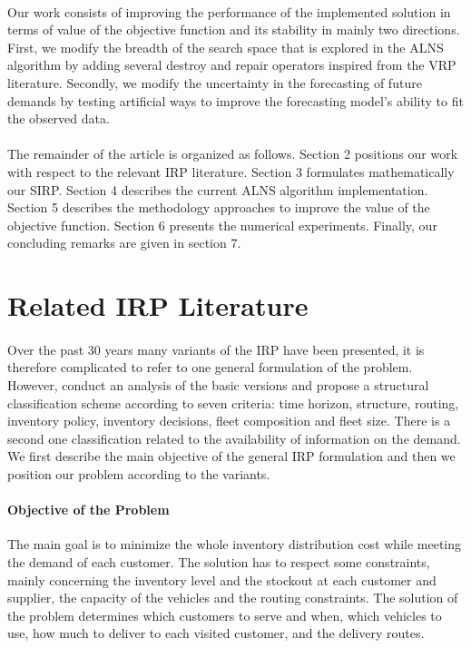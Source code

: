 \documentclass[12pt,a4paper]{article}
\begin{document}
\paragraph{}
Our work consists of improving the performance of the implemented solution in terms of value of the objective function and its stability in mainly two directions. First, we modify the breadth of the search space that is explored in the ALNS algorithm by adding several destroy and repair operators inspired from the VRP literature. Secondly, we modify the uncertainty in the forecasting of future demands by testing artificial ways to improve the forecasting model's ability to fit the observed data.  
\paragraph{}
The remainder of the article is organized as follows. Section 2 positions our work with respect to the relevant IRP literature. Section 3 formulates mathematically our SIRP. Section 4 describes the current ALNS algorithm implementation. Section 5 describes the methodology approaches to improve the value of the objective function. Section 6 presents the numerical experiments. Finally, our concluding remarks are given in section 7.

\section{Related IRP Literature}
\paragraph{}
Over the past 30 years many variants of the IRP have been presented, it is therefore complicated to refer to one general formulation of the problem. However, \cite{Coelho2014} conduct an analysis of the basic versions and propose a structural classification scheme according to seven criteria: time horizon, structure, routing, inventory policy, inventory decisions, fleet composition and fleet size. There is a second one classification related to the availability of information on the demand. We first describe the main objective of the general IRP formulation and then we position our problem according to the variants.
\paragraph{Objective of the Problem}
The main goal is to minimize the whole inventory distribution cost while meeting the demand of each customer. The solution has to respect some constraints, mainly concerning the inventory level and the stockout at each customer and supplier, the capacity of the vehicles and the routing constraints. The solution of the problem determines which customers to serve and when, which vehicles to use, how much to deliver to each visited customer, and the delivery routes. 
\end{document}
